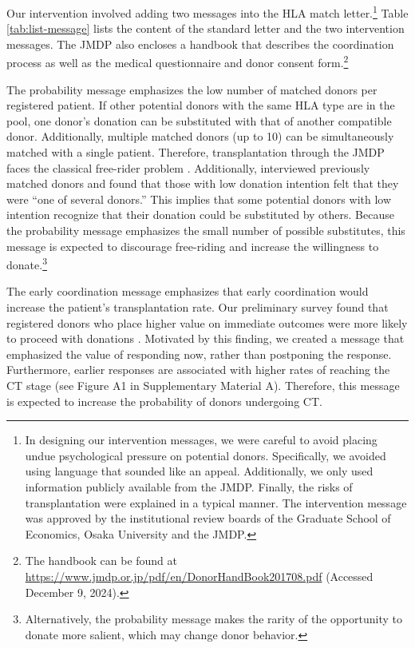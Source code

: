 \documentclass[12pt, a4paper]{article}
\begin{document}
Our intervention involved adding two messages into the HLA match letter.\footnote{In designing our intervention messages, we were careful to avoid placing undue psychological pressure on potential donors. Specifically, we avoided using language that sounded like an appeal. Additionally, we only used information publicly available from the JMDP. Finally, the risks of transplantation were explained in a typical manner. The intervention message was approved by the institutional review boards of the Graduate School of Economics, Osaka University and the JMDP.} Table \ref{tab:list-message} lists the content of the standard letter and the two intervention messages. The JMDP also encloses a handbook that describes the coordination process as well as the medical questionnaire and donor consent form.\footnote{The handbook can be found at \url{https://www.jmdp.or.jp/pdf/en/DonorHandBook201708.pdf} (Accessed December 9, 2024).}

The probability message emphasizes the low number of matched donors per registered patient. If other potential donors with the same HLA type are in the pool, one donor's donation can be substituted with that of another compatible donor. Additionally, multiple matched donors (up to 10) can be simultaneously matched with a single patient. Therefore, transplantation through the JMDP faces the classical free-rider problem \citep{Bergstrom2009}. Additionally, \citet{Kurosawa2022} interviewed previously matched donors and found that those with low donation intention felt that they were ``one of several donors.'' This implies that some potential donors with low intention recognize that their donation could be substituted by others. Because the probability message emphasizes the small number of possible substitutes, this message is expected to discourage free-riding and increase the willingness to donate.\footnote{Alternatively, the probability message makes the rarity of the opportunity to donate more salient, which may change donor behavior.}

The early coordination message emphasizes that early coordination would increase the patient's transplantation rate. Our preliminary survey found that registered donors who place higher value on immediate outcomes were more likely to proceed with donations \citep{Ohtake2020}. Motivated by this finding, we created a message that emphasized the value of responding now, rather than postponing the response. Furthermore, earlier responses are associated with higher rates of reaching the CT stage (see Figure A1 in Supplementary Material A). Therefore, this message is expected to increase the probability of donors undergoing CT.
\end{document}
